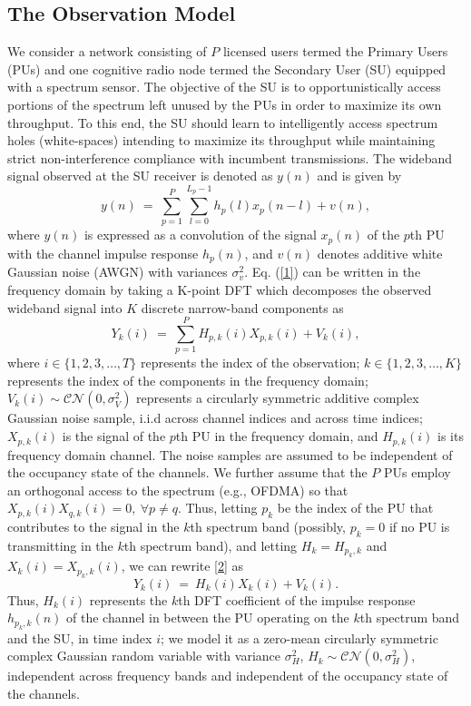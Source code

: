\documentclass[10pt,twocolumn]{IEEEtran}
\begin{document}
\subsection{The Observation Model}
We consider a network consisting of $P$ licensed users termed the Primary Users (PUs) and one cognitive radio node termed the Secondary User (SU) equipped with a spectrum sensor. The objective of the SU is to opportunistically access portions of the spectrum left unused by the PUs in order to maximize its own throughput. To this end, the SU should learn to intelligently access spectrum holes (white-spaces) intending to maximize its throughput while maintaining strict non-interference compliance with incumbent transmissions. The wideband signal observed at the SU receiver is denoted as $y(n)$ and is given by
\begin{equation}\label{1}
    y(n)\ =\ \sum_{p=1}^{P}\sum_{l=0}^{L_{p}-1} h_{p}(l)x_{p}(n-l) + v(n),
\end{equation}
where $y(n)$ is expressed as a convolution of the signal $x_{p}(n)$ of the $p$th PU with the channel impulse response $h_{p}(n)$, and $v(n)$ denotes additive white Gaussian noise (AWGN) with variances $\sigma_v^2$. Eq. (\ref{1}) can be written in the frequency domain by taking a K-point DFT which decomposes the observed wideband signal into $K$ discrete narrow-band components as
\begin{equation}\label{2}
    Y_k(i)\ =\ \sum_{p=1}^{P}H_{p,k}(i)X_{p,k}(i)+V_k(i),
\end{equation}
where $i \in \{1,2,3,\dots,T\}$ represents the index of the observation; $k \in \{1,2,3,\dots,K\}$ represents the index of the components in the frequency domain; $V_k(i) \sim \mathcal{CN}(0,\sigma_V^2)$ represents a circularly symmetric additive complex Gaussian noise sample, i.i.d across channel indices and across time indices; $X_{p,k}(i)$ is the signal of the $p$th PU in the frequency domain, and $H_{p,k}(i)$ is its frequency domain channel. The noise samples are assumed to be independent of the occupancy state of the channels. We further assume that the $P$ PUs employ an orthogonal access to the spectrum (e.g., OFDMA) so that $X_{p,k}(i)X_{q,k}(i)=0,\ \forall p\neq q$. Thus, letting $p_k$ be the index of the PU that contributes to the signal in the $k$th spectrum band (possibly, $p_k=0$ if no PU is transmitting in the $k$th spectrum band), and letting  $H_{k}=H_{p_k,k}$ and $X_{k}(i)=X_{p_k,k}(i)$, we can rewrite \eqref{2} as
\begin{equation}\label{3}
    Y_k(i)\ =\ H_{k}(i)X_{k}(i) + V_k(i).
\end{equation}
Thus, $H_k(i)$ represents the $k$th DFT coefficient of the impulse response $h_{p_k,k}(n)$ of the channel in between the PU operating on the $k$th spectrum band and the SU, in time index $i$; we model it as a zero-mean circularly symmetric complex Gaussian random variable with variance $\sigma_H^2$, $H_k \sim \mathcal{CN}(0,\sigma_H^2)$, independent across frequency bands and independent of the occupancy state of the channels.
\end{document}
